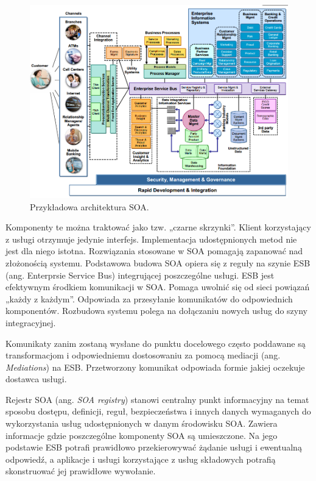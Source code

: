 \begin{figure}[h!tbp]
\begin{centering}
\includegraphics[width=15cm]{img/soa_arch.png}
\caption[Przykładowa architektura SOA.]{Przykładowa architektura SOA.}\label{PRZArchSOA}
\end{centering}
\end{figure}

Komponenty te można traktować jako tzw. „czarne skrzynki”. Klient korzystający z usługi otrzymuje jedynie interfejs. Implementacja udostępnionych metod nie jest dla niego istotna.
Rozwiązania stosowane w SOA pomagają zapanować nad złożonością systemu. Podstawowa budowa SOA opiera się z reguły na szynie ESB (ang. Enterprsie Service Bus) integrującej poszczególne usługi. ESB jest efektywnym środkiem komunikacji w SOA. Pomaga uwolnić się od sieci powiązań „każdy z każdym”. Odpowiada za przesyłanie komunikatów do odpowiednich komponentów. Rozbudowa systemu polega na dołączaniu nowych usług do szyny integracyjnej. 
	
Komunikaty zanim zostaną wysłane do punktu docelowego często poddawane są transformacjom i odpowiedniemu dostosowaniu za pomocą mediacji (ang. \emph{Mediations}) na ESB. Przetworzony komunikat odpowiada formie jakiej oczekuje dostawca usługi.
	
Rejestr SOA (ang. \emph{SOA registry}) stanowi centralny punkt informacyjny na temat sposobu dostępu, definicji, reguł, bezpieczeństwa i innych danych wymaganych do wykorzystania usług udostępnionych w danym środowisku SOA. Zawiera informacje gdzie poszczególne komponenty SOA są umieszczone. Na jego podstawie ESB potrafi prawidłowo przekierowywać żądanie usługi i ewentualną odpowiedź, a aplikacje i usługi korzystające z usług składowych potrafią skonstruować jej prawidłowe wywołanie.
	
